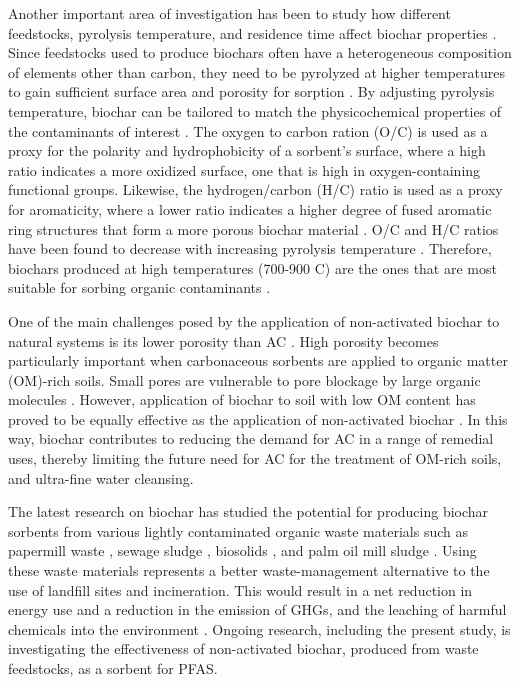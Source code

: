 Another important area of investigation has been to study how different feedstocks, pyrolysis temperature, and residence time affect biochar properties \citep{Hale2016}. Since feedstocks used to produce biochars often have a heterogeneous composition of elements other than carbon, they need to be pyrolyzed at higher temperatures to gain sufficient surface area and porosity for sorption \citep{beesley2011review}. By adjusting pyrolysis temperature, biochar can be tailored to match the physicochemical properties of the contaminants of interest \citep{Hale2016}. The oxygen to carbon ration (O/C) is used as a proxy for the polarity and hydrophobicity of a sorbent's surface, where a high ratio indicates a more oxidized surface, one that is high in oxygen-containing functional groups. Likewise, the hydrogen/carbon (H/C) ratio is used as a proxy for aromaticity, where a lower ratio indicates a higher degree of fused aromatic ring structures that form a more porous biochar material \citep{Ahmad2014}. O/C and H/C ratios have been found to decrease with increasing pyrolysis temperature \citep{Hale2016}. Therefore, biochars produced at high temperatures (700-900 \textdegree C) are the ones that are most suitable for sorbing organic contaminants \citep{Figueiredo2018}. 

One of the main challenges posed by the application of non-activated biochar to natural systems is its lower porosity than AC \citep{leng2021overview}. High porosity becomes particularly important when carbonaceous sorbents are applied to organic matter (\acrshort{OM})-rich soils. Small pores are vulnerable to pore blockage by large organic molecules \citep{Sorengard2019}. However, application of biochar to soil with low OM content has proved to be equally effective as the application of non-activated biochar \citep{Alhashimi2017}. In this way, biochar contributes to reducing the demand for AC in a range of remedial uses, thereby limiting the future need for AC for the treatment of OM-rich soils, and ultra-fine water cleansing. 

The latest research on biochar has studied the potential for producing biochar sorbents from various lightly contaminated organic waste materials such as papermill waste \citep{van2010effects}, sewage sludge \citep{fathianpour2018lead}, biosolids \citep{wang2011}, and palm oil mill sludge \citep{lam2017adsorption}. Using these waste materials represents a better waste-management alternative to the use of landfill sites and incineration. This would result in a net reduction in energy use and a reduction in the emission of GHGs, and the leaching of harmful chemicals into the environment \citep{Alhashimi2017}. Ongoing research, including the present study, is investigating the effectiveness of non-activated biochar, produced from waste feedstocks, as a sorbent for PFAS. 

